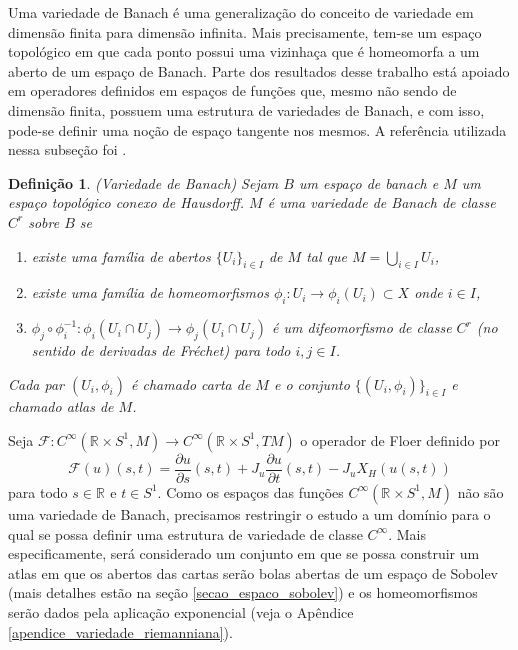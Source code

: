 \documentclass[12pt]{book}
\newtheorem{definicao}[teorema]{Definição}
\newcommand{\aplicaoessuaves}[2]{C^{\infty}(#1, #2)}
\newcommand{\circulo}{S^{1}}
\newcommand{\derivadaparcial}[2]{\frac{\partial #1}{\partial #2}}
\newcommand{\operadorFloer}{\mathcal{F}}
\newcommand{\operadorFloerDefParametros}[1]{\derivadaparcial{#1}{s}(s,t) + J_{#1}\derivadaparcial{#1}{t}(s,t) - J_{#1}X_{H}(#1(s,t))}
\newcommand{\operadorFloerParametro}[1]{\mathcal{F}(#1)}
\newcommand{\retacartesianocirculo}{\real{} \times \circulo}
\newcommand{\real}[1]{\mathbb{R}^{#1}}
\newcommand{\reta}{\real{}}
\begin{document}
	Uma variedade de Banach é uma generalização do conceito de variedade em dimensão finita para dimensão infinita. Mais precisamente, tem-se um espaço topológico em que cada ponto possui uma vizinhaça que é homeomorfa a um aberto de um espaço de Banach. Parte dos resultados desse trabalho está apoiado em operadores definidos em espaços de funções que, mesmo não sendo de dimensão finita, possuem uma estrutura de variedades de Banach, e com isso, pode-se definir uma noção de espaço tangente nos mesmos. A referência utilizada nessa subseção foi \cite{chang_morse_infinito}.
	
	\begin{definicao}
		(Variedade de Banach) Sejam $B$ um espaço de banach e $M$ um espaço topológico conexo de Hausdorff. $M$ é uma variedade de Banach de classe $C^{r}$ sobre $B$ se
		
		\begin{enumerate}
			\item existe uma família de abertos $\{U_{i}\}_{i\in I}$ de $M$ tal que $M=\bigcup_{i\in I}U_{i}$,
			
			\item existe uma família de homeomorfismos $ \phi_{i}:U_{i}\to \phi_{i}(U_{i})\subset X $ onde $i\in I$,
			
			\item $\phi_{j}\circ \phi_{i}^{-1}: \phi_{i}(U_{i}\cap U_{j}) \to \phi_{j}(U_{i}\cap U_{j}) $ é um difeomorfismo de classe $C^{r}$ (no sentido de derivadas de Fréchet) para todo $i,j \in I$.
		\end{enumerate}
		
		Cada par $(U_{i}, \phi_{i})$ é chamado carta de $M$ e  o conjunto $\{(U_{i}, \phi_{i})\}_{i\in I}$ e chamado atlas de $M$.
	\end{definicao}
	
	Seja $\operadorFloer :\aplicaoessuaves{\retacartesianocirculo}{M}\to \aplicaoessuaves{\retacartesianocirculo}{TM}$ o operador de Floer definido por 
	$$
	\operadorFloerParametro{u}(s,t)=\operadorFloerDefParametros{u}
	$$
	para todo $s\in \reta$ e $t\in \circulo$. Como os espaços das funções $\aplicaoessuaves{\retacartesianocirculo}{M}$ não são uma variedade de Banach, precisamos restringir o estudo a um domínio para o qual se possa definir uma estrutura de variedade de classe $C^{\infty}$. Mais especificamente,  será considerado um conjunto em que se possa construir um atlas em que os abertos das cartas serão bolas abertas de um espaço de Sobolev (mais detalhes estão na seção \ref{secao_espaco_sobolev}) e os homeomorfismos serão dados pela aplicação exponencial (veja o Apêndice \ref{apendice_variedade_riemanniana}).
	
\end{document}
